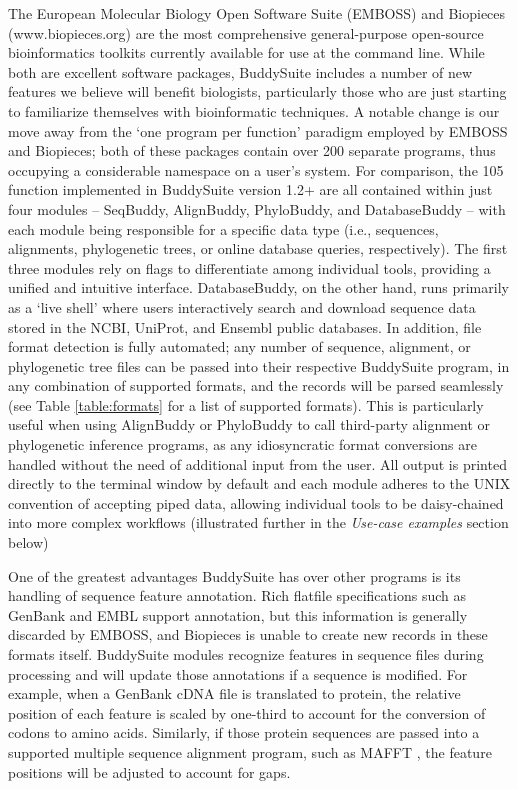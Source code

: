 \documentclass[nogrid]{MBE}%
\begin{document}
The European Molecular Biology Open Software Suite (EMBOSS) \cite{Rice:2000wr} and Biopieces (www.biopieces.org) are the most comprehensive general-purpose open-source bioinformatics toolkits currently available for use at the command line. While both are excellent software packages, BuddySuite includes a number of new features we believe will benefit biologists, particularly those who are just starting to familiarize themselves with bioinformatic techniques. A notable change is our move away from the `one program per function' paradigm employed by EMBOSS and Biopieces; both of these packages contain over 200 separate programs, thus occupying a considerable namespace on a user's system. For comparison, the 105 function implemented in BuddySuite version 1.2+ are all contained within just four modules -- SeqBuddy, AlignBuddy, PhyloBuddy, and DatabaseBuddy -- with each module being responsible for a specific data type (i.e., sequences, alignments, phylogenetic trees, or online database queries, respectively). The first three modules rely on flags to differentiate among individual tools, providing a unified and intuitive interface. DatabaseBuddy, on the other hand, runs primarily as a `live shell' where users interactively search and download sequence data stored in the NCBI, UniProt, and Ensembl public databases. In addition, file format detection is fully automated; any number of sequence, alignment, or phylogenetic tree files can be passed into their respective BuddySuite program, in any combination of supported formats, and the records will be parsed seamlessly (see Table \ref{table:formats} for a list of supported formats). This is particularly useful when using AlignBuddy or PhyloBuddy to call third-party alignment or phylogenetic inference programs, as any idiosyncratic format conversions are handled without the need of additional input from the user. All output is printed directly to the terminal window by default and each module adheres to the UNIX convention of accepting piped data, allowing individual tools to be daisy-chained into more complex workflows (illustrated further in the \emph{Use-case examples} section below)

One of the greatest advantages BuddySuite has over other programs is its handling of sequence feature annotation. Rich flatfile specifications such as GenBank and EMBL support annotation, but this information is generally discarded by EMBOSS, and Biopieces is unable to create new records in these formats itself. BuddySuite modules recognize features in sequence files during processing and will update those annotations if a sequence is modified. For example, when a GenBank cDNA file is translated to protein, the relative position of each feature is scaled by one-third to account for the conversion of codons to amino acids. Similarly, if those protein sequences are passed into a supported multiple sequence alignment program, such as MAFFT \cite{Katoh:2013hm}, the feature positions will be adjusted to account for gaps.
\end{document}
